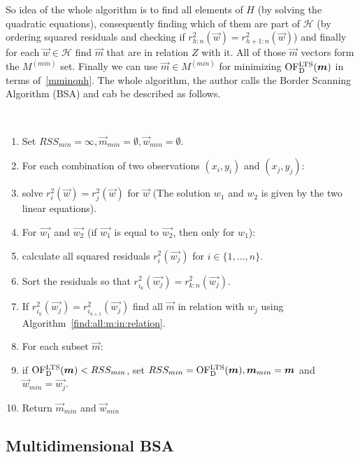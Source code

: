 So idea of the whole algorithm is to find all elements of $H$ (by solving the quadratic equations), consequently finding which of them are part of $\mathcal{H}$ (by ordering squared residuals and checking if $r^{2}_{h:n}(\vec{w}) = r^{2}_{h+1:n}(\vec{w})$) and finally for each $\vec{w} \in \mathcal{H}$ find $\vec{m}$ that are in relation $Z$ with it. All of those $\vec{m}$ vectors form the $M^{(min)}$ set. Finally we can use $\vec{m} \in M^{(min)}$ for minimizing $\operatorname{OF^{LTS}_D}(\boldsymbol{m})$ in terms of~\eqref{mminqnh}. The whole algorithm, the author calls the Border Scanning Algorithm (BSA) and cab be described as follows.

\begin{algo}[BSA for the $p=1$] \label{bsa:one:dimensional}
    \mbox{}\vspace{\dimexpr-\baselineskip-\topsep}
\\
    \begin{enumerate}
        \item Set $RSS_{min} = \infty, \vec{m}_{min} = \emptyset, \vec{w}_{min} = \emptyset$.
        \item For each combination of two observations $(x_i, y_i)$ and $(x_j, y_j)$:
        \item solve $r^2_i(\vec{w}) = r^2_j(\vec{w})$ for $\vec{w}$ (The solution $w_1$ and $w_2$ is given by the two linear equations).
        \item For $\vec{w_1}$ and $\vec{w_2}$ (if $\vec{w_1}$ is equal to $\vec{w_2}$, then only for $w_1$):
        \item calculate all squared residuals $r^{2}_i(\vec{w_j})$ for $i \in \{{1, \ldots,n\}}$.
        \item Sort the residuals so that $r^{2}_{i_k}(\vec{w_j}) = r^{2}_{k:n}(\vec{w_j})$.
        \item If $r^{2}_{i_h}(\vec{w_j}) = r^{2}_{i_{h+1}}(\vec{w_j})$ find all $\vec{m}$ in relation with $w_j$ using Algorithm~\ref{find:all:m:in:relation}.
        \item For each subset $\vec{m}$:
        \item if $ \operatorname{OF^{LTS}_D}(\boldsymbol{m}) < RSS_{min}$, set $RSS_{min} = \operatorname{OF^{LTS}_D}(\boldsymbol{m}), \boldsymbol{m}_{min} = \boldsymbol{m}$ and $ \vec{w}_{min} = \vec{w_j} $.
        \item Return $\vec{m}_{min} $ and $ \vec{w}_{min}$
    \end{enumerate}
\end{algo}


\subsection{Multidimensional BSA}

